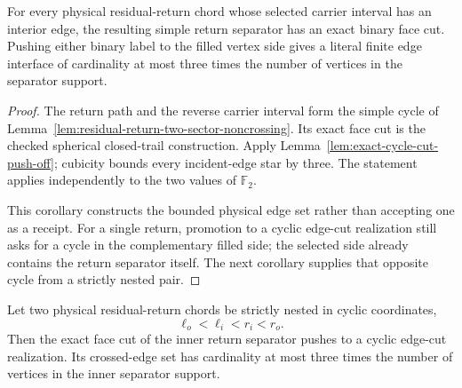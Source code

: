 \begin{corollary}
\label{cor:residual-return-bounded-push-off}
For every physical residual-return chord whose selected carrier interval has
an interior edge, the resulting simple return separator has an exact binary
face cut.  Pushing either binary label to the filled vertex side gives a
literal finite edge interface of cardinality at most three times the number
of vertices in the separator support.
\end{corollary}

\begin{proof}
The return path and the reverse carrier interval form the simple cycle of
Lemma~\ref{lem:residual-return-two-sector-noncrossing}.  Its exact face cut is
the checked spherical closed-trail construction.  Apply
Lemma~\ref{lem:exact-cycle-cut-push-off}; cubicity bounds every incident-edge
star by three.  The statement applies independently to the two values of
$\mathbb F_2$.

This corollary constructs the bounded physical edge set rather than accepting
one as a receipt.  For a single return, promotion to a cyclic edge-cut
realization still asks for a cycle in the complementary filled side; the
selected side already contains the return separator itself.  The next
corollary supplies that opposite cycle from a strictly nested pair.
\end{proof}

\begin{corollary}
\label{cor:nested-residual-return-cyclic-cut}
Let two physical residual-return chords be strictly nested in cyclic
coordinates,
\[
                  \ell_o<\ell_i<r_i<r_o.
\]
Then the exact face cut of the inner return separator pushes to a cyclic
edge-cut realization.  Its crossed-edge set has cardinality at most three
times the number of vertices in the inner separator support.
\end{corollary}

